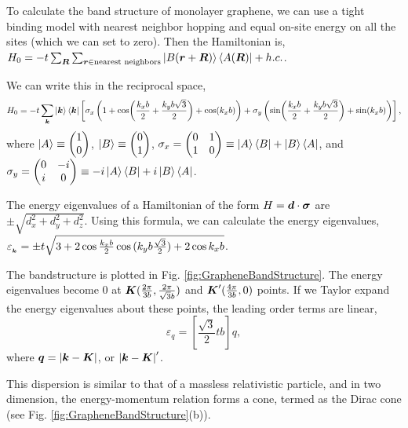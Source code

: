 \documentclass{report}
\renewcommand\vec[1]{\ensuremath\boldsymbol{#1}} %
\begin{document}
To calculate the band structure of monolayer graphene, we can use a tight binding model with nearest neighbor hopping and equal on-site energy on all the sites (which we can set to zero). Then the Hamiltonian is,
$H_0 = -t \sum_{\vec{R}} \sum_{\vec{r} \in {\text{nearest neighbors}}} \ket{B(\vec{r}+\vec{R})} \bra{A(\vec{R})} + h.c.$.

We can write this in the reciprocal space,
$$H_0 = -t \sum_{\vec{k}} \ket{\vec{k}}\bra{\vec{k}} \left[\sigma_x \left(1 + \cos(\frac{k_x b}{2} + \frac{k_y b \sqrt{3}}{2}) + \cos(k_x b)\right) + \sigma_y \left( \sin(\frac{k_x b}{2} + \frac{k_y b \sqrt{3}}{2}) + \sin(k_x b)\right)\right],$$
where $\ket{A} \equiv \begin{pmatrix}
1 \\
0 
\end{pmatrix}$, 
$\ket{B} \equiv \begin{pmatrix}
0 \\
1 
\end{pmatrix}$,
$\sigma_x = 
\begin{pmatrix}
	0 & 1 \\
	1 & 0
\end{pmatrix} \equiv \ket{A} \bra{B} + \ket{B} \bra{A}$, and 
$\sigma_y = 
\begin{pmatrix}
	0 & -i \\
	i & 0
\end{pmatrix} \equiv -i\ket{A} \bra{B} + i\ket{B} \bra{A}$.

The energy eigenvalues of a Hamiltonian of the form $H = \vec{d} \cdot \vec{\sigma}$ are $\pm \sqrt{d_x^2 + d_y^2 + d_z^2}$. Using this formula, we can calculate the energy eigenvalues,
$\varepsilon_{_{\vec{k}}}  = \pm t \sqrt{3 + 2 \cos{\frac{k_x b}{2}} \cos{(k_y b \frac{\sqrt{3}}{2})} + 2 \cos{k_x b}}$.

The bandstructure is plotted in Fig. \ref{fig:GrapheneBandStructure}. The energy eigenvalues become 0 at $\vec{K} (\frac{2\pi}{3b},\frac{2\pi}{\sqrt{3} b})$ and $\vec{K}'(\frac{4\pi}{3b},0)$ points. If we Taylor expand the energy eigenvalues about these points, the leading order terms are linear, $$\varepsilon_{q} = \left[\frac{\sqrt{3}}{2} t b\right] q,$$ where $\vec{q} = \left| \vec{k} - \vec{K} \right|$, or $\left| \vec{k} - \vec{K} \right|'$.

This dispersion is similar to that of a massless relativistic particle, and in two dimension, the energy-momentum relation forms a cone, termed as the Dirac cone (see Fig. \ref{fig:GrapheneBandStructure}(b)).
\end{document}
